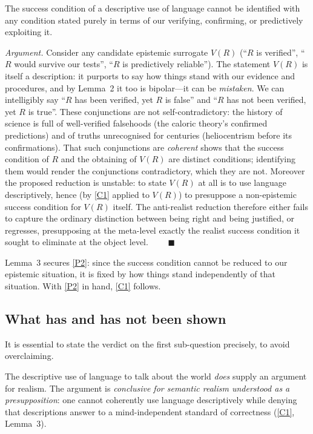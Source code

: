 \documentclass[12pt]{article}
\begin{document}
\begin{description}[leftmargin=1.6em,style=nextline]
\item[Lemma 3 (Non-identity of truth and verification).] The success
condition of a descriptive use of language cannot be identified with any
condition stated purely in terms of our verifying, confirming, or
predictively exploiting it.
\end{description}

\noindent\emph{Argument.} Consider any candidate epistemic surrogate
$V(R)$ (``$R$ is verified'', ``$R$ would survive our tests'', ``$R$ is
predictively reliable''). The statement $V(R)$ is itself a description: it
purports to say how things stand with our evidence and procedures, and by
Lemma~2 it too is bipolar---it can be \emph{mistaken}. We can
intelligibly say ``$R$ has been verified, yet $R$ is false'' and ``$R$ has
not been verified, yet $R$ is true''. These conjunctions are not
self-contradictory: the history of science is full of well-verified
falsehoods (the caloric theory's confirmed predictions) and of truths
unrecognised for centuries (heliocentrism before its confirmations).
That such conjunctions are \emph{coherent} shows that the success
condition of $R$ and the obtaining of $V(R)$ are distinct conditions;
identifying them would render the conjunctions contradictory, which they
are not. Moreover the proposed reduction is unstable: to state $V(R)$ at
all is to use language descriptively, hence (by \ref{C1} applied to
$V(R)$) to presuppose a non-epistemic success condition for $V(R)$
itself. The anti-realist reduction therefore either fails to capture the
ordinary distinction between being right and being justified, or
regresses, presupposing at the meta-level exactly the realist success
condition it sought to eliminate at the object level.
$\qquad\blacksquare$

Lemma~3 secures \ref{P2}: since the success condition cannot be reduced to
our epistemic situation, it is fixed by how things stand independently of
that situation. With \ref{P2} in hand, \ref{C1} follows.

\subsection{What has and has not been shown}

It is essential to state the verdict on the first sub-question precisely,
to avoid overclaiming.

\begin{description}[leftmargin=1.6em,style=nextline]
\item[Verdict on realism.] The descriptive use of language to talk about
the world \emph{does} supply an argument for realism. The argument is
\emph{conclusive for semantic realism understood as a presupposition}:
one cannot coherently use language descriptively while denying that
descriptions answer to a mind-independent standard of correctness
(\ref{C1}, Lemma~3).
\end{description}
\end{document}
